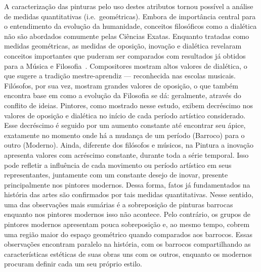 A caracterização das pinturas pelo uso destes atributos tornou
possível a análise de medidas quantitativas (i.e.\ geométricas). Embora de
importância central para o entendimento da evolução da humanidade,
conceitos filosóficos como a dialética não são abordados comumente
pelas Ciências Exatas. Enquanto tratadas como medidas geométricas, as
medidas de oposição, inovação e dialética revelaram conceitos
importantes que puderam ser comparados com resultados já obtidos para
a Música e Filosofia~\cite{vieira}. Compositores mostram altos valores
de dialética, o que sugere a tradição mestre-aprendiz --- reconhecida
nas escolas musicais. Filósofos, por sua vez, mostram grandes valores
de oposição, o que também encontra base em como a evolução da
Filosofia se dá: geralmente, através do conflito de ideias. Pintores,
como mostrado nesse estudo, exibem decréscimo nos valores de oposição
e dialética no início de cada período artístico considerado. Esse
decréscimo é seguido por um aumento constante até encontrar seu ápice,
exatamente no momento onde há a mudança de um período (Barroco) para o
outro (Moderno). Ainda, diferente dos filósofos e músicos, na Pintura
a inovação apresenta valores com acréscimo constante, durante toda a
série temporal. Isso pode refletir a influência de cada movimento ou
período artístico em seus representantes, juntamente com um constante
desejo de inovar, presente principalmente nos pintores modernos. Dessa
forma, fatos já fundamentados na história das artes são confirmados
por tais medidas quantitativas. Nesse sentido, uma das observações
mais sumárias é a sobreposição de pinturas barrocas enquanto nos
pintores modernos isso não acontece. Pelo contrário, os grupos de
pintores modernos apresentam pouca sobreposição e, ao mesmo tempo,
cobrem uma região maior do espaço geométrico quando comparados aos
barrocos. Essas observações encontram paralelo na história, com os
barrocos compartilhando as características estéticas de suas obras uns
com os outros, enquanto os modernos procuram definir cada um seu
próprio estilo.

